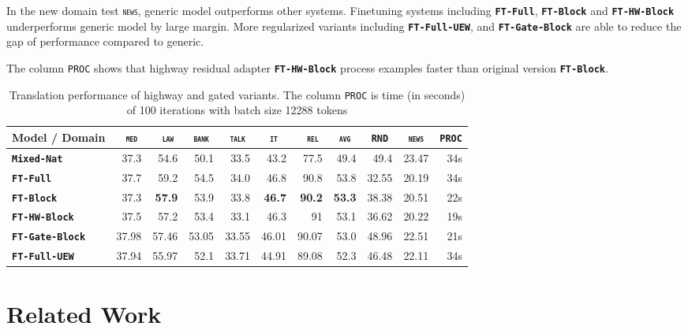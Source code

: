 \documentclass[11pt,a4paper]{article}
\newcommand{\fyDone}[1]{\done[FY]\Todo[FY:]{\textcolor{orange}{#1}}}
\newcommand{\mpDone}[1]{\done[MP]\Todo[MP:]{\textcolor{green}{#1}}}
\newcommand{\domain}[1]{\texttt{\textsc{#1}}}
\newcommand{\system}[1]{\texttt{\textbf{#1}}}
\newcommand{\SB}[1]{\textbf{#1}}
\begin{document}
In the new domain test \domain{news}, generic model outperforms other systems. Finetuning systems including \system{FT-Full}, \system{FT-Block} and \system{FT-HW-Block} underperforms generic model by large margin. More regularized variants including \system{FT-Full-UEW}, and \system{FT-Gate-Block} are able to reduce the gap of performance compared to generic.

The column \domain{PROC} shows that highway residual adapter \system{FT-HW-Block} process examples faster than original version \system{FT-Block}.

\begin{table}[htbp]
  \centering
  \fyDone{Fix column size}
  \begin{tabular}{|p{3cm}|*{10}{r|}} \hline
    Model / Domain & \multicolumn{1}{c|}{\domain{ med}} & \multicolumn{1}{c|}{\domain{ law}} & \multicolumn{1}{c|}{\domain{bank}} & \multicolumn{1}{c|}{\domain{talk}} & \multicolumn{1}{c|}{\domain{ it }} & \multicolumn{1}{c|}{\domain{ rel}} & \multicolumn{1}{c|}{\domain{avg}} & \multicolumn{1}{c|}{\domain{RND}} & \multicolumn{1}{c|}{\domain{news}} & \multicolumn{1}{c|}{\domain{PROC}} \\ \hline  
    \system{Mixed-Nat}  & 37.3 & 54.6 & 50.1 & 33.5 & 43.2 & 77.5  &  49.4 & 49.4 & 23.47 & 34s \\
   \system{FT-Full}       & 37.7 & 59.2 & 54.5 & 34.0 & 46.8 & 90.8 & 53.8 & 32.55 & 20.19 & 34s \\
   \system{FT-Block}     & 37.3 & \SB{57.9} & 53.9 & 33.8 & \SB{46.7} & \SB{90.2}  &  \SB{53.3} & 38.38 & 20.51 & 22s\\ 
   \system{FT-HW-Block}   & 37.5 & 57.2 & 53.4 & 33.1 & 46.3 & 91 & 53.1 & 36.62 & 20.22 & 19s \\
   \hline 
    \system{FT-Gate-Block}    & 37.98 &	57.46&	53.05&	33.55&	46.01&	90.07&	53.0&	48.96 & 22.51 & 21s \\
    \system{FT-Full-UEW} &	37.94 &	55.97 &	52.1 &	33.71 &	44.91 &	89.08 &	52.3 &	46.48 & 22.11& 34s \\
     \hline
  \end{tabular}
  \caption{Translation performance of highway and gated variants. The column \domain{PROC} is time (in seconds) of 100 iterations with batch size 12288 tokens}
  \label{tab:performance-random}
\end{table}

\section{Related Work \label{sec:related}}
\mpDone{related work}
\end{document}
